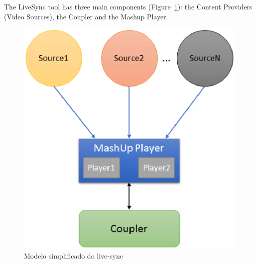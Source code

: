 The LiveSync tool has three main components (Figure~\ref{livesync}): the Content Providers (Video Sources), the Coupler and the Mashup Player.

\begin{figure}[h]
	\centerline{\includegraphics[scale=0.6] {figures/architecture}}
	\caption{Modelo simplificado do live-sync}
	\label{livesync}
\end{figure}